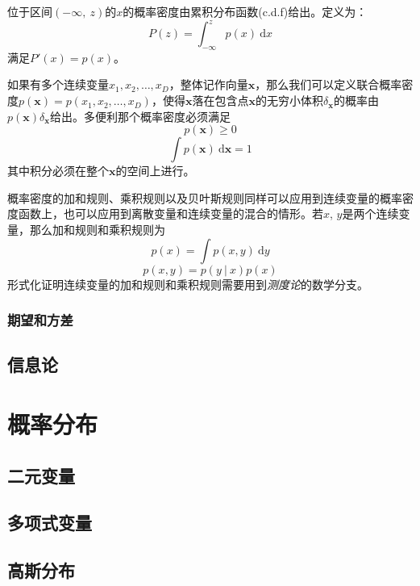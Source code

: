 \documentclass[11pt]{ctexbook}
\begin{document}
位于区间$(-\infty,\ z)$的$x$的概率密度由累积分布函数(c.d.f)给出。定义为：
\begin{equation}
	P(z) = \int_{-\infty}^{z}p(x)\ \mathrm{d}x
\end{equation}
满足$P'(x) = p(x)$。

如果有多个连续变量$x_1, x_2, \ldots, x_D$，整体记作向量$\bm x$，那么我们可以定义联合概率密度$p(\bm x) = p(x_1, x_2, \ldots, x_D)$，使得$\bm x$落在包含点$\bm x$的无穷小体积$\delta_{\bm x}$的概率由$p(\bm x) \delta_{\bm x}$给出。多便利那个概率密度必须满足
\begin{equation}
	p(\bm x) \geqslant 0
\end{equation}
\begin{equation}
	\int p(\bm x)\ \mathrm{d}\bm x = 1
\end{equation}
其中积分必须在整个$\bm x$的空间上进行。

概率密度的加和规则、乘积规则以及贝叶斯规则同样可以应用到连续变量的概率密度函数上，也可以应用到离散变量和连续变量的混合的情形。若$x$, $y$是两个连续变量，那么加和规则和乘积规则为
\begin{equation}
	p(x) = \int p(x, y)\ \mathrm{d}y
\end{equation}
\begin{equation}
	p(x, y) = p(y\ |\ x)p(x)
\end{equation}
形式化证明连续变量的加和规则和乘积规则需要用到\emph{测度论}的数学分支。

\subsection{期望和方差}
\section{信息论}

\chapter{概率分布}
\section{二元变量}
\section{多项式变量}
\section{高斯分布}
\end{document}
